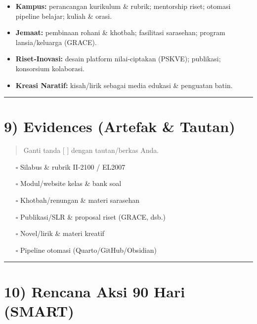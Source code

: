 \documentclass[
  letterpaper,
  DIV=11,
  numbers=noendperiod]{scrreprt}
\providecommand{\tightlist}{%
  \setlength{\itemsep}{0pt}\setlength{\parskip}{0pt}}
\begin{document}
\begin{itemize}
\tightlist
\item
  \textbf{Kampus:} perancangan kurikulum \& rubrik; mentorship riset;
  otomasi pipeline belajar; kuliah \& orasi.
\item
  \textbf{Jemaat:} pembinaan rohani \& khotbah; fasilitasi sarasehan;
  program lansia/keluarga (GRACE).
\item
  \textbf{Riset‑Inovasi:} desain platform nilai‑ciptakan (PSKVE);
  publikasi; konsorsium kolaborasi.
\item
  \textbf{Kreasi Naratif:} kisah/lirik sebagai media edukasi \&
  penguatan batin.
\end{itemize}

\begin{center}\rule{0.5\linewidth}{0.5pt}\end{center}

\section{9) Evidences (Artefak \&
Tautan)}\label{evidences-artefak-tautan}

\begin{quote}
Ganti tanda {[} {]} dengan tautan/berkas Anda.
\end{quote}

\begin{itemize}
\tightlist
\item[$\square$]
  Silabus \& rubrik II‑2100 / EL2007
\item[$\square$]
  Modul/website kelas \& bank soal
\item[$\square$]
  Khotbah/renungan \& materi sarasehan
\item[$\square$]
  Publikasi/SLR \& proposal riset (GRACE, dsb.)
\item[$\square$]
  Novel/lirik \& materi kreatif
\item[$\square$]
  Pipeline otomasi (Quarto/GitHub/Obsidian)
\end{itemize}

\begin{center}\rule{0.5\linewidth}{0.5pt}\end{center}

\section{10) Rencana Aksi 90 Hari
(SMART)}\label{rencana-aksi-90-hari-smart}
\end{document}
